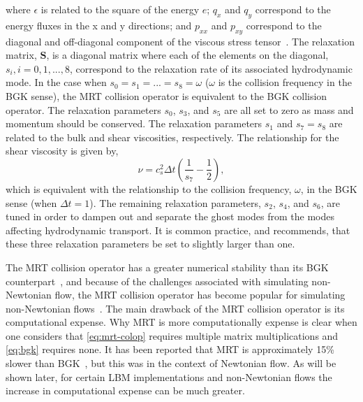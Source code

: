 \documentclass{article}
\newcommand{\relaxM}{\mathbf{S}}
\begin{document}
\noindent where $\epsilon$ is related to the square of the energy $e$; $q_x$ and $q_y$ correspond to the energy fluxes in the x and y directions; and $p_{xx}$ and $p_{xy}$ correspond to the diagonal and off-diagonal component of the viscous stress tensor~\cite{lallemand2000theory}. %
The relaxation matrix, $\relaxM$, is a diagonal matrix where each of the elements on the diagonal, $s_i, i = 0, 1, ..., 8$, correspond to the relaxation rate of its associated hydrodynamic mode.
In the case when $s_0 = s_1 = ... = s_8 = \omega$ ($\omega$ is the collision frequency in the BGK sense), the MRT collision operator is equivalent to the BGK collision operator.
The relaxation parameters $s_0$, $s_3$, and $s_5$ are all set to zero as mass and momentum should be conserved.
The relaxation parameters $s_1$ and $s_7 = s_8$ are related to the bulk and shear viscosities, respectively.
The relationship for the shear viscosity is given by,
\begin{equation} \label{eq:mrt-s7}
\nu = c_s^2 \Delta t (\frac{1}{s_7} - \frac{1}{2}),
\end{equation}
\noindent which is equivalent with the relationship to the collision frequency, $\omega$, in the BGK sense (when $\Delta t = 1$).
The remaining relaxation parameters, $s_2$, $s_4$, and $s_6$, are tuned in order to dampen out and separate the ghost modes from the modes affecting hydrodynamic transport.
It is common practice, and \citet{lallemand2000theory} recommends, that these three relaxation parameters be set to slightly larger than one.

The MRT collision operator has a greater numerical stability than its BGK counterpart~\cite{lallemand2000theory,dellar2003incompressible,d2002multiple}, and because of the challenges associated with simulating non-Newtonian flow, the MRT collision operator has become popular for simulating non-Newtonian flows~\cite{chen2014simulations,fallah2012multiple,tang2011bingham,vikhansky2008lattice,chai2011multiple,grasinger2015simulation}.
The main drawback of the MRT collision operator is its computational expense.
Why MRT is more computationally expense is clear when one considers that \eqref{eq:mrt-colop} requires multiple matrix multiplications and \eqref{eq:bgk} requires none.
It has been reported that MRT is approximately 15\% slower than BGK~\cite{d2002multiple}, but this was in the context of Newtonian flow.
As will be shown later, for certain LBM implementations and non-Newtonian flows the increase in computational expense can be much greater.
\end{document}
